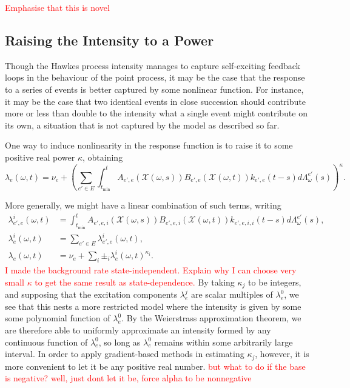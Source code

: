 \documentclass[honours,12pt]{unswthesis}
\numberwithin{equation}{section}
\begin{document}
\textcolor{red}{Emphasise that this is novel}

\subsection{Raising the Intensity to a Power}
Though the Hawkes process intensity manages to capture self-exciting feedback loops in the behaviour of the point process, it may be the case that the response to a series of events is better captured by some nonlinear function. For instance, it may be the case that two identical events in close succession should contribute more or less than double to the intensity what a single event might contribute on its own, a situation that is not captured by the model as described so far.

One way to induce nonlinearity in the response function is to raise it to some positive real power $\kappa$, obtaining
$$\lambda_e(\omega,t) = \nu_e + \left(\sum_{e'\in E}\int_{t_\mathrm{min}}^t A_{e',e}(\mathcal{X}(\omega,s))B_{e',e}(\mathcal{X}(\omega,t))k_{e',e}(t-s)d\Lambda_\omega^{e'}(s)\right)^\kappa.$$

More generally, we might have a linear combination of such terms, writing
\begin{equation}
	\begin{align}
		\lambda_{e',e}^i(\omega,t) &= \int_{t_\mathrm{min}}^t A_{e',e,i}(\mathcal{X}(\omega,s))B_{e',e,i}(\mathcal{X}(\omega,t))k_{e',e,i,i}(t-s)d\Lambda_\omega^{e'}(s), \\
		\lambda_e^i(\omega,t) &= \sum_{e'\in E}\lambda_{e',e}^i(\omega,t), \\
		\lambda_e(\omega,t) &= \nu_e + \sum_i \pm_i \lambda_e^i(\omega,t)^{\kappa_i}.
	\end{align}\label{eq:general_model}
\end{equation}
\textcolor{red}{I made the background rate state-independent. Explain why I can choose very small $\kappa$ to get the same result as state-dependence.}
By taking $\kappa_j$ to be integers, and supposing that the excitation components $\lambda_e^j$ are scalar multiples of $\lambda_e^0$, we see that this nests a more restricted model where the intensity is given by some some polynomial function of $\lambda_e^0$. By the Weierstrass approximation theorem, we are therefore able to uniformly approximate an intensity formed by any continuous function of $\lambda_e^0$, so long as $\lambda_e^0$ remains within some arbitrarily large interval. In order to apply gradient-based methods in estimating $\kappa_j$, however, it is more convenient to let it be any positive real number. \textcolor{red}{but what to do if the base is negative? well, just dont let it be, force alpha to be nonnegative}
\end{document}
